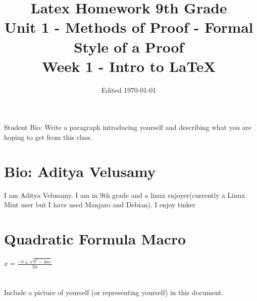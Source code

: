 \documentclass{article}
\title{Latex Homework 9th Grade\\ Unit 1 - Methods of Proof - Formal Style of a Proof\\ Week 1 - Intro to LaTeX}
\author{}
\date{Edited \today}
\newcommand{\quadform}{$x=\frac{-b\pm\sqrt{b^2-4ac}}{2a}$}
\begin{document}
\maketitle

\section{}
Student Bio: Write a paragraph introducing yourself and describing what you are hoping to get from this class.

\section{Bio: Aditya Velusamy}
I am Aditya Velusamy. I am in 9th grade and a linux enjoyer(currently a Linux Mint user but I have used Manjaro and Debian). I enjoy tinker 

\section{Quadratic Formula Macro}
\quadform
\section{}
Include a picture of yourself (or representing yourself) in this document.
\end{document}
